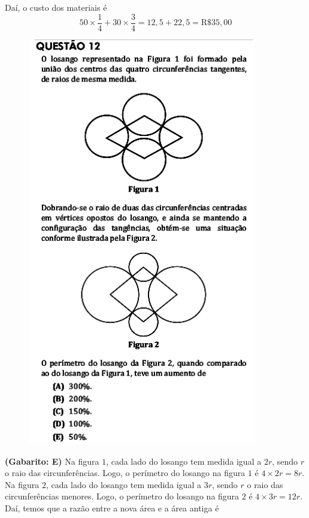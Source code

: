 \documentclass[a4paper]{article}
\begin{document}
\par\vspace{0.3cm} Daí, o custo dos materiais é
\begin{equation*}
50\times \frac{1}{4} + 30\times\frac{3}{4} = 12,5+22,5 = \text{R\$}35,00
\end{equation*}
\begin{figure}[H]
	\begin{center}
		\includegraphics[width=10cm]{L5Q12.png}
	\end{center}
\end{figure}
\par\textbf{(Gabarito: E)} Na figura $1$, cada lado do losango tem medida igual a $2r$, sendo $r$ o raio das circunferências. Logo, o perímetro do losango na figura $1$ é $4\times 2r = 8r$. Na figura $2$, cada lado do losango tem medida igual a $3r$, sendo $r$ o raio das circunferências menores. Logo, o perímetro do losango na figura $2$ é $4\times 3r = 12r$. Daí, temos que a razão entre a nova área e a área antiga é
\end{document}
